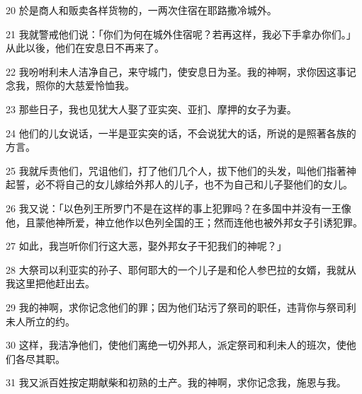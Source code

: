 \par 20 於是商人和贩卖各样货物的，一两次住宿在耶路撒冷城外。
\par 21 我就警戒他们说：「你们为何在城外住宿呢？若再这样，我必下手拿办你们。」从此以後，他们在安息日不再来了。
\par 22 我吩咐利未人洁净自己，来守城门，使安息日为圣。我的神啊，求你因这事记念我，照你的大慈爱怜恤我。
\par 23 那些日子，我也见犹大人娶了亚实突、亚扪、摩押的女子为妻。
\par 24 他们的儿女说话，一半是亚实突的话，不会说犹大的话，所说的是照著各族的方言。
\par 25 我就斥责他们，咒诅他们，打了他们几个人，拔下他们的头发，叫他们指著神起誓，必不将自己的女儿嫁给外邦人的儿子，也不为自己和儿子娶他们的女儿。
\par 26 我又说：「以色列王所罗门不是在这样的事上犯罪吗？在多国中并没有一王像他，且蒙他神所爱，神立他作以色列全国的王；然而连他也被外邦女子引诱犯罪。
\par 27 如此，我岂听你们行这大恶，娶外邦女子干犯我们的神呢？」
\par 28 大祭司以利亚实的孙子、耶何耶大的一个儿子是和伦人参巴拉的女婿，我就从我这里把他赶出去。
\par 29 我的神啊，求你记念他们的罪；因为他们玷污了祭司的职任，违背你与祭司利未人所立的约。
\par 30 这样，我洁净他们，使他们离绝一切外邦人，派定祭司和利未人的班次，使他们各尽其职。
\par 31 我又派百姓按定期献柴和初熟的土产。我的神啊，求你记念我，施恩与我。



